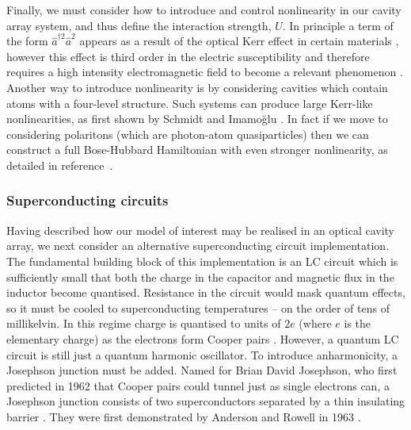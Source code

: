 Finally, we must consider how to introduce and control nonlinearity in our cavity array system, and thus define the interaction strength, \(U\). In principle a term of the form \(\hat{a}^{\dagger 2}\hat{a}^{2}\) appears as a result of the optical Kerr effect in certain materials \cite{Kitagawa1986}, however this effect is third order in the electric susceptibility and therefore requires a high intensity electromagnetic field to become a relevant phenomenon \cite{Boyd_KerrNL}. Another way to introduce nonlinearity is by considering cavities which contain atoms with a four-level structure. Such systems can produce large Kerr-like nonlinearities, as first shown by Schmidt and Imamo\u{g}lu \cite{Schmidt1996}. In fact if we move to considering polaritons (which are photon-atom quasiparticles) then we can construct a full Bose-Hubbard Hamiltonian with even stronger nonlinearity, as detailed in reference~\cite{Hartmann2008}.

\subsubsection{Superconducting circuits}
Having described how our model of interest may be realised in an optical cavity array, we next consider an alternative superconducting circuit implementation. The fundamental building block of this implementation is an LC circuit which is sufficiently small that both the charge in the capacitor and magnetic flux in the inductor become quantised. Resistance in the circuit would mask quantum effects, so it must be cooled to superconducting temperatures -- on the order of tens of millikelvin. In this regime charge is quantised to units of \(2e\) (where \(e\) is the elementary charge) as the electrons form Cooper pairs \cite{Vool2017,Cooper1956}. However, a quantum LC circuit is still just a quantum harmonic oscillator. To introduce anharmonicity, a Josephson junction must be added. Named for Brian David Josephson, who first predicted in 1962 that Cooper pairs could tunnel just as single electrons can, a Josephson junction consists of two superconductors separated by a thin insulating barrier \cite{Josephson1962,Schoelkopf2008}. They were first demonstrated by Anderson and Rowell in 1963 \cite{Anderson1963}.

